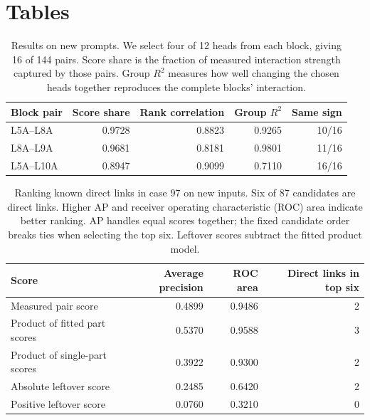 \documentclass[11pt,letterpaper]{article}
\begin{document}
\clearpage
\section*{Tables}
\begin{table}[H]
\singlespacing\centering
\caption{Results on new prompts. We select four of 12 heads from each block,
giving 16 of 144 pairs. Score share is the fraction of measured interaction
strength captured by those pairs. Group $R^2$ measures how well changing the
chosen heads together reproduces the complete blocks' interaction.}
\label{tab:heads}
\begin{tabular}{lrrrr}
\toprule
Block pair & Score share & Rank correlation & Group $R^2$ & Same sign\\
\midrule
L5A--L8A  & 0.9728 & 0.8823 & 0.9265 & 10/16\\
L8A--L9A  & 0.9681 & 0.8181 & 0.9801 & 11/16\\
L5A--L10A & 0.8947 & 0.9099 & 0.7110 & 16/16\\
\bottomrule
\end{tabular}
\end{table}

\begin{table}[H]
\singlespacing\centering
\caption{Ranking known direct links in case 97 on new inputs. Six of 87
candidates are direct links. Higher AP and receiver operating characteristic (ROC) area indicate better ranking.
AP handles equal scores together; the fixed candidate order breaks ties when
selecting the top six. Leftover scores subtract the fitted product model.}
\label{tab:gt}
\begin{tabular}{lrrr}
\toprule
Score & Average precision & ROC area & Direct links in top six\\
\midrule
Measured pair score & 0.4899 & 0.9486 & 2\\
Product of fitted part scores & 0.5370 & 0.9588 & 3\\
Product of single-part scores & 0.3922 & 0.9300 & 2\\
Absolute leftover score & 0.2485 & 0.6420 & 2\\
Positive leftover score & 0.0760 & 0.3210 & 0\\
\bottomrule
\end{tabular}
\end{table}
\end{document}
